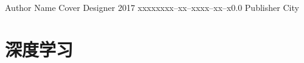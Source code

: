 \documentclass[11pt]{linearbook}
\begin{document}
       {Author Name}
       {Cover Designer}
       {2017}
       {xxxxx}{xxx--xx--xxxx--xx--x}{0.0}
       {Publisher}
       {City}

\mainmatter
\chapter{深度学习}







\end{document}
